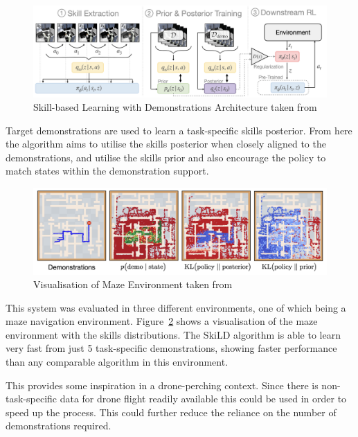 \begin{figure}[htbp]
  \centering
  \includegraphics[width=\textwidth]{background/fyp15-skild-architecture.png}
  \caption{Skill-based Learning with Demonstrations Architecture taken from~\cite{fyp15-demo-guided-rl-with-skills}}
\label{fig:fyp15-skild}
\end{figure}

Target demonstrations are used to learn a task-specific skills posterior.
From here the algorithm aims to utilise the skills posterior when closely aligned to the demonstrations, and utilise the skills prior and also encourage the policy to match states within the demonstration support.

\begin{figure}[htbp]
  \centering
  \includegraphics[width=\textwidth]{background/fyp15-maze-diagram.png}
  \caption{Visualisation of Maze Environment taken from~\cite{fyp15-demo-guided-rl-with-skills}}
\label{fig:fyp15-maze}
\end{figure}

This system was evaluated in three different environments, one of which being a maze navigation environment.
Figure~\ref{fig:fyp15-maze} shows a visualisation of the maze environment with the skills distributions.
The SkiLD algorithm is able to learn very fast from just 5 task-specific demonstrations, showing faster performance than any comparable algorithm in this environment.

This provides some inspiration in a drone-perching context.
Since there is non-task-specific data for drone flight readily available this could be used in order to speed up the process.
This could further reduce the reliance on the number of demonstrations required.